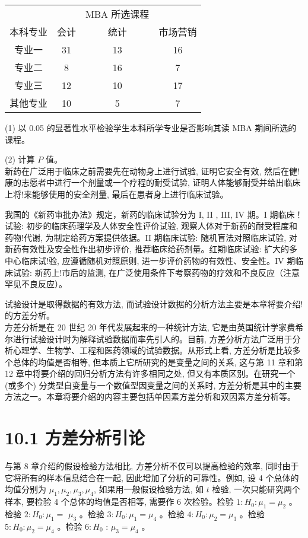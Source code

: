 \documentclass[10pt]{article}
\begin{document}
\begin{CJK*}{UTF8}{bsmi}
\begin{center}
\begin{tabular}{cccc}
\hline
 &  & MBA 所选课程 &  \\
\cline { 2 - 4 }
本科专业 & 会计 & 统计 & 市场营销 \\
\hline
专业一 & 31 & 13 & 16 \\
专业二 & 8 & 16 & 7 \\
专业三 & 12 & 10 & 17 \\
其他专业 & 10 & 5 & 7 \\
\hline
\end{tabular}
\end{center}

(1) 以 0.05 的显著性水平检验学生本科所学专业是否影响其读 MBA 期间所选的课程。

(2) 计算 $P$ 值。\\

新药在广泛用于临床之前需要先在动物身上进行试验, 证明它安全有效, 然后在健!康的志愿者中进行一个剂量或一个疗程的耐受试验, 证明人体能够耐受并给出临床上将!来能够使用的安全剂量, 最后在患者身上进行临床试验。

我国的《新药审批办法》规定，新药的临床试验分为 I, II , III, IV 期。I 期临床！试验: 初步的临床药理学及人体安全性评价试验, 观察人体对于新药的耐受程度和药物!代谢, 为制定给药方案提供依据。II 期临床试验: 随机盲法对照临床试验, 对新药有效性及安全性作出初步评价, 推荐临床给药剂量。红期临床试验: 扩大的多中心临床试!验, 应遵循随机对照原则, 进一步评价药物的有效性、安全性。IV 期临床试验: 新药上!市后的监测, 在广泛使用条件下考察药物的疗效和不良反应（注意罕见不良反应）。

试验设计是取得数据的有效方法, 而试验设计数据的分析方法主要是本章将要介绍!的方差分析。\\
方差分析是在 20 世纪 20 年代发展起来的一种统计方法, 它是由英国统计学家费希尔进行试验设计时为解释试验数据而率先引人的。目前, 方差分析方法广泛用于分析心理学、生物学、工程和医药领域的试验数据。从形式上看, 方差分析是比较多个总体的均值是否相等, 但本质上它所研究的是变量之间的关系, 这与第 11 章和第 12 章中将要介绍的回归分析方法有许多相同之处, 但又有本质区别。在研究一个 (或多个) 分类型自变量与一个数值型因变量之间的关系时, 方差分析是其中的主要方法之一。本章将要介绍的内容主要包括单因素方差分析和双因素方差分析等。

\section*{10.1 方差分析引论}
与第 8 章介绍的假设检验方法相比, 方差分析不仅可以提高检验的效率, 同时由于它将所有的样本信息结合在一起, 因此增加了分析的可靠性。例如, 设 4 个总体的均值分别为 $\mu_{1}, \mu_{2}, \mu_{3}, \mu_{4}$, 如果用一般假设检验方法, 如 $t$ 检验, 一次只能研究两个样本, 要检验 4 个总体的均值是否相等, 需要作 6 次检验。检验 $1: H_{0}: \mu_{1}=\mu_{2}$ 。检验 $2: H_{0}: \mu_{1}=$ $\mu_{3}$ 。检验 $3: H_{0}: \mu_{1}=\mu_{4}$ 。检验 $4: H_{0}: \mu_{2}=\mu_{3}$ 。检验 $5: H_{0}: \mu_{2}=\mu_{4}$ 。检验 $6: H_{0}$ : $\mu_{3}=\mu_{4}$ 。


\end{CJK*}
\end{document}

